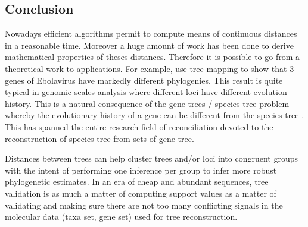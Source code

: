 %

\subsection{Conclusion}

Nowadays efficient algorithms permit to compute means of continuous distances in a reasonable time. Moreover a huge amount of work has been done to derive mathematical properties of theses distances. Therefore it is possible to go from a theoretical work to applications. For example, \citet{Kendall2016} use tree mapping to show that 3 genes of Ebolavirus have markedly different phylogenies. This result is quite typical in genomic-scales analysis where different loci have different evolution history. This is a natural consequence of the gene trees / species tree problem whereby the evolutionary history of a gene can be different from the species tree \citep{Degnan2009}. This has spanned the entire research field of reconciliation devoted to the reconstruction of species tree from sets of gene tree. 

Distances between trees can help cluster trees and/or loci into congruent groups with the intent of performing one inference per group to infer more robust phylogenetic estimates. In an era of cheap and abundant sequences, tree validation is as much a matter of computing support values as a matter of validating and making sure there are not too many conflicting signals in the molecular data (taxa set, gene set) used for tree reconstruction. 